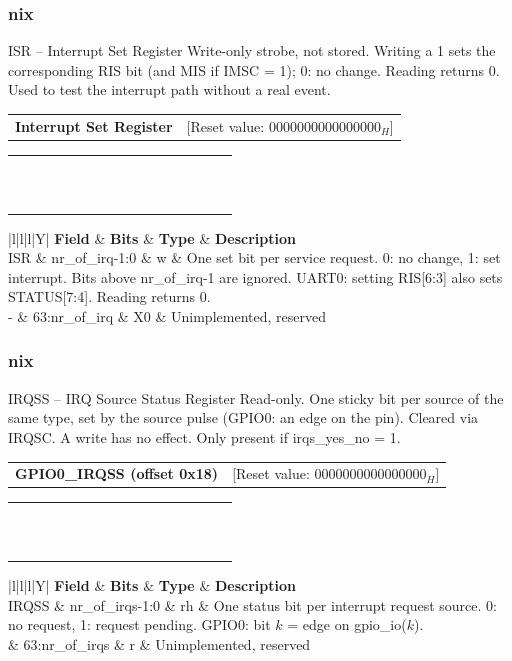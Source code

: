 \documentclass{beamer}
\makeatletter
\newcommand{\astitle}{nix}
\newcommand{\assubtitle}{nix}
\newcommand{\asregkopf}[2]{%
{\scriptsize
\begin{tabularx}{\textwidth}{@{}Xr@{}}
  \textbf{#1} & [Reset value: {#2}]
\end{tabularx}}\par}
\newcommand{\asregfourxsixteen}[8]{%
{\tiny\setlength{\tabcolsep}{1pt}\renewcommand{\arraystretch}{0.95}%
\begin{tabularx}{\textwidth}{|*{16}{>{\centering\arraybackslash}X|}}
  \hline
  63 & 62 & 61 & 60 & 59 & 58 & 57 & 56 & 55 & 54 & 53 & 52 & 51 & 50 & 49 & 48 \\
  \hline
  #1 \\
  \hline
  #2 \\
  \hline
  \hline
  47 & 46 & 45 & 44 & 43 & 42 & 41 & 40 & 39 & 38 & 37 & 36 & 35 & 34 & 33 & 32 \\
  \hline
  #3 \\
  \hline
  #4 \\
  \hline
  \hline
  31 & 30 & 29 & 28 & 27 & 26 & 25 & 24 & 23 & 22 & 21 & 20 & 19 & 18 & 17 & 16 \\
  \hline
  #5 \\
  \hline
  #6 \\
  \hline
  \hline
  15 & 14 & 13 & 12 & 11 & 10 & 09 & 08 & 07 & 06 & 05 & 04 & 03 & 02 & 01 & 00 \\
  \hline
  #7 \\
  \hline
  #8 \\
  \hline
\end{tabularx}}\par}
\newcommand{\asregdesc}[1]{%
{\tiny\renewcommand{\arraystretch}{1.1}%
\begin{tabularx}{\dimexpr\textwidth-1.1cm\relax}{|l|l|l|Y|}
  \hline
  \textbf{Field} & \textbf{Bits} & \textbf{Type} & \textbf{Description} \\
  \hline
  #1 \\
  \hline
\end{tabularx}}\par}
\newcommand{\asrow}[1]{\multicolumn{16}{|c|}{#1}}
\makeatother
\begin{document}
\renewcommand{\assubtitle}{ISR -- Interrupt Set Register}
\begin{frame}
\frametitle{\astitle}
\begin{block}{\assubtitle}
{\tiny Write-only strobe, not stored. Writing a 1 sets the corresponding RIS bit
(and MIS if IMSC = 1); 0: no change. Reading returns 0. Used to test the interrupt
path without a real event.}
\vspace{2pt}
\asregkopf{Interrupt Set Register}{$0000000000000000_H$}
\asregfourxsixteen{\asrow{-}}{\asrow{X0}}
                  {\asrow{-}}{\asrow{X0}}
                  {\asrow{-}}{\asrow{X0}}
                  {\multicolumn{16}{|c|}{- / ISR}}{\multicolumn{16}{|c|}{X0 / w}}
\vspace{2pt}
\asregdesc{ISR & nr\_of\_irq-1:0 & w & One set bit per service request. 0: no change, 1: set interrupt. Bits above nr\_of\_irq-1 are ignored. UART0: setting RIS[6:3] also sets STATUS[7:4]. Reading returns 0. \\
           \hline
           - & 63:nr\_of\_irq & X0 & Unimplemented, reserved}
\end{block}
\end{frame}

\renewcommand{\assubtitle}{IRQSS -- IRQ Source Status Register}
\begin{frame}
\frametitle{\astitle}
\begin{block}{\assubtitle}
{\tiny Read-only. One sticky bit per source of the same type, set by the source
pulse (GPIO0: an edge on the pin). Cleared via IRQSC. A write has no effect.
Only present if irqs\_yes\_no = 1.}
\vspace{2pt}
\asregkopf{GPIO0\_IRQSS (offset 0x18)}{$0000000000000000_H$}
\asregfourxsixteen{\asrow{0}}{\asrow{r}}
                  {\asrow{0}}{\asrow{r}}
                  {\asrow{0}}{\asrow{r}}
                  {\multicolumn{8}{|c|}{0}&\multicolumn{8}{c|}{IRQSS}}
                  {\multicolumn{8}{|c|}{r}&\multicolumn{8}{c|}{rh}}
\vspace{2pt}
\asregdesc{IRQSS & nr\_of\_irqs-1:0 & rh & One status bit per interrupt request source. 0: no request, 1: request pending. GPIO0: bit $k$ = edge on gpio\_io($k$). \\
           \hline
           0 & 63:nr\_of\_irqs & r & Unimplemented, reserved}
\end{block}
\end{frame}
\end{document}
